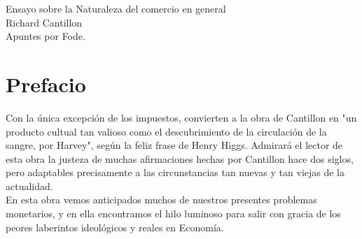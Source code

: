 \documentclass[10pt]{article}
\begin{document}
\begin{center}
\huge Ensayo sobre la Naturaleza del comercio en general\\
\vspace*{0.5cm}
\large Richard Cantillon\\
\vspace{1cm}
\Large Apuntes por Fode.
\vspace{1.5cm}
\end{center}


\section*{Prefacio}
Con la única excepción de los impuestos, convierten a la obra de Cantillon en "un producto cultual tan valioso como el descubrimiento de la circulación de la sangre, por Harvey", según la feliz frase de Henry Higgs. Admirará el lector de esta obra la justeza de muchas afirmaciones hechas por Cantillon hace dos siglos, pero adaptables precisamente a las circunstancias tan nuevas y tan viejas de la actualidad.\\
En esta obra vemos anticipados muchos de nuestros presentes problemas monetarios, y en ella encontramos el hilo luminoso para salir con gracia de los peores laberintos ideológicos y reales en Economía.
\end{document}
